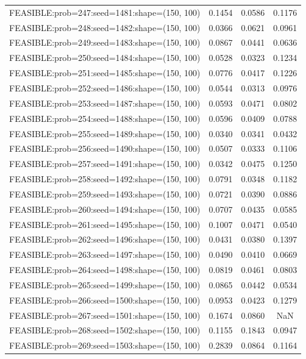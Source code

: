 \begin{longtable}{lccc}
FEASIBLE:prob=247:seed=1481:shape=(150, 100) & 0.1454 & 0.0586 & 0.1176 \\
FEASIBLE:prob=248:seed=1482:shape=(150, 100) & 0.0366 & 0.0621 & 0.0961 \\
FEASIBLE:prob=249:seed=1483:shape=(150, 100) & 0.0867 & 0.0441 & 0.0636 \\
FEASIBLE:prob=250:seed=1484:shape=(150, 100) & 0.0528 & 0.0323 & 0.1234 \\
FEASIBLE:prob=251:seed=1485:shape=(150, 100) & 0.0776 & 0.0417 & 0.1226 \\
FEASIBLE:prob=252:seed=1486:shape=(150, 100) & 0.0544 & 0.0313 & 0.0976 \\
FEASIBLE:prob=253:seed=1487:shape=(150, 100) & 0.0593 & 0.0471 & 0.0802 \\
FEASIBLE:prob=254:seed=1488:shape=(150, 100) & 0.0596 & 0.0409 & 0.0788 \\
FEASIBLE:prob=255:seed=1489:shape=(150, 100) & 0.0340 & 0.0341 & 0.0432 \\
FEASIBLE:prob=256:seed=1490:shape=(150, 100) & 0.0507 & 0.0333 & 0.1106 \\
FEASIBLE:prob=257:seed=1491:shape=(150, 100) & 0.0342 & 0.0475 & 0.1250 \\
FEASIBLE:prob=258:seed=1492:shape=(150, 100) & 0.0791 & 0.0348 & 0.1182 \\
FEASIBLE:prob=259:seed=1493:shape=(150, 100) & 0.0721 & 0.0390 & 0.0886 \\
FEASIBLE:prob=260:seed=1494:shape=(150, 100) & 0.0707 & 0.0435 & 0.0585 \\
FEASIBLE:prob=261:seed=1495:shape=(150, 100) & 0.1007 & 0.0471 & 0.0540 \\
FEASIBLE:prob=262:seed=1496:shape=(150, 100) & 0.0431 & 0.0380 & 0.1397 \\
FEASIBLE:prob=263:seed=1497:shape=(150, 100) & 0.0490 & 0.0410 & 0.0669 \\
FEASIBLE:prob=264:seed=1498:shape=(150, 100) & 0.0819 & 0.0461 & 0.0803 \\
FEASIBLE:prob=265:seed=1499:shape=(150, 100) & 0.0865 & 0.0442 & 0.0534 \\
FEASIBLE:prob=266:seed=1500:shape=(150, 100) & 0.0953 & 0.0423 & 0.1279 \\
FEASIBLE:prob=267:seed=1501:shape=(150, 100) & 0.1674 & 0.0860 &    NaN \\
FEASIBLE:prob=268:seed=1502:shape=(150, 100) & 0.1155 & 0.1843 & 0.0947 \\
FEASIBLE:prob=269:seed=1503:shape=(150, 100) & 0.2839 & 0.0864 & 0.1164 \\

\end{longtable}
